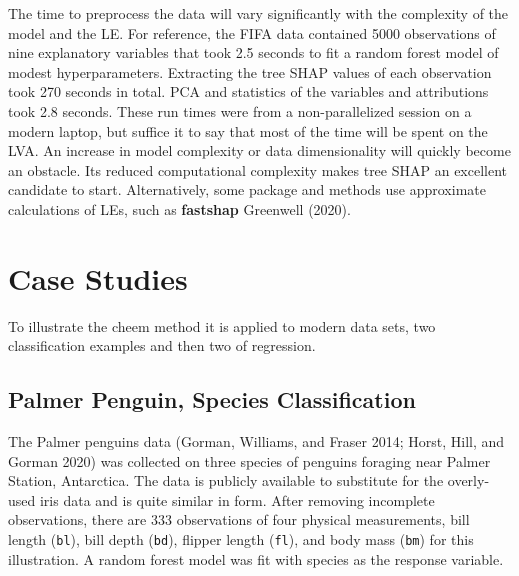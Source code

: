 \documentclass[
]{article}
\begin{document}
The time to preprocess the data will vary significantly with the complexity of the model and the LE. For reference, the FIFA data contained 5000 observations of nine explanatory variables that took 2.5 seconds to fit a random forest model of modest hyperparameters. Extracting the tree SHAP values of each observation took 270 seconds in total. PCA and statistics of the variables and attributions took 2.8 seconds. These run times were from a non-parallelized session on a modern laptop, but suffice it to say that most of the time will be spent on the LVA. An increase in model complexity or data dimensionality will quickly become an obstacle. Its reduced computational complexity makes tree SHAP an excellent candidate to start. Alternatively, some package and methods use approximate calculations of LEs, such as \textbf{fastshap} Greenwell (2020).

\hypertarget{sec:casestudies}{%
\section{Case Studies}\label{sec:casestudies}}

To illustrate the cheem method it is applied to modern data sets, two classification examples and then two of regression.

\hypertarget{palmer-penguin-species-classification}{%
\subsection{Palmer Penguin, Species Classification}\label{palmer-penguin-species-classification}}

The Palmer penguins data (Gorman, Williams, and Fraser 2014; Horst, Hill, and Gorman 2020) was collected on three species of penguins foraging near Palmer Station, Antarctica. The data is publicly available to substitute for the overly-used iris data and is quite similar in form. After removing incomplete observations, there are 333 observations of four physical measurements, bill length (\texttt{bl}), bill depth (\texttt{bd}), flipper length (\texttt{fl}), and body mass (\texttt{bm}) for this illustration. A random forest model was fit with species as the response variable.
\end{document}
